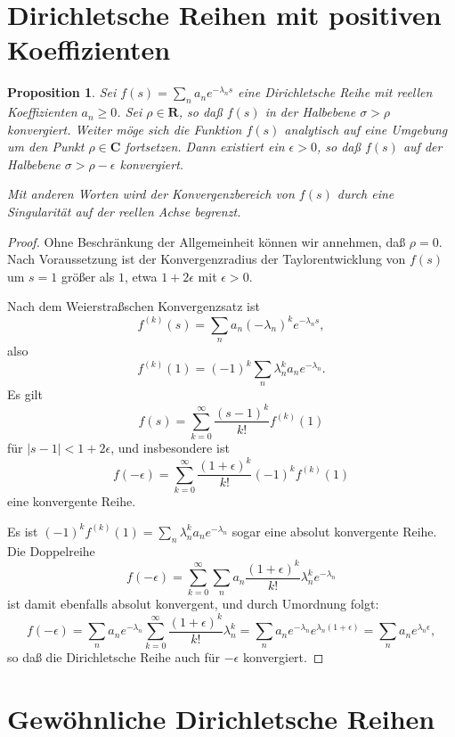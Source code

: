 \documentclass[a4paper,twoside,openright]{report}
\newtheorem{prop}[thm]{Proposition}
\theoremstyle{definition}
\theoremstyle{remark}
\begin{document}
\section{Dirichletsche Reihen mit positiven Koeffizienten}

\begin{prop}
  \label{prop:positivity}
  Sei $f(s) = \sum_n a_n e^{-\lambda_n s}$ eine Dirichletsche Reihe mit
  reellen Koeffizienten $a_n \ge 0$. Sei $\rho \in \mathbf R$, so daß
  $f(s)$ in der Halbebene $\sigma > \rho$ konvergiert. Weiter möge sich die
  Funktion $f(s)$ analytisch auf eine Umgebung um den Punkt $\rho \in \mathbf C$
  fortsetzen. Dann existiert ein $\epsilon > 0$, so daß $f(s)$ auf der Halbebene
  $\sigma > \rho - \epsilon$ konvergiert.
  
  Mit anderen Worten wird der Konvergenzbereich von $f(s)$ durch eine Singularität
  auf der reellen Achse begrenzt.
\end{prop}

\begin{proof}
  Ohne Beschränkung der Allgemeinheit können wir annehmen, daß
  $\rho = 0$.
  Nach Voraussetzung ist der Konvergenzradius der Taylorentwicklung von $f(s)$ um
  $s = 1$ größer als $1$, etwa $1 + 2 \epsilon$ mit $\epsilon > 0$.
  
  Nach dem Weierstraßschen Konvergenzsatz ist
  \[
    f^{(k)}(s) = \sum_n a_n (-\lambda_n)^k e^{-\lambda_n s},
  \]
  also
  \[
    f^{(k)}(1) = (-1)^k \sum_n \lambda_n^k a_n e^{-\lambda_n}.
  \]
  Es gilt
  \[
    f(s) = \sum_{k = 0}^\infty \frac {(s - 1)^k} {k!} f^{(k)}(1)
  \]
  für $|s - 1| < 1 + 2 \epsilon$,
  und insbesondere ist
  \[
    f(-\epsilon) = \sum_{k = 0}^\infty \frac {(1 + \epsilon)^k} {k!} (-1)^k f^{(k)}(1)
  \]
  eine konvergente Reihe.
  
  Es ist $(-1)^k f^{(k)}(1) = \sum_n \lambda_n^k a_n e^{-\lambda_n}$
  sogar eine absolut konvergente Reihe. Die Doppelreihe
  \[
    f(-\epsilon) = \sum_{k = 0}^\infty \sum_n a_n \frac {(1 + \epsilon)^k}{k!} \lambda_n^k e^{-\lambda_n}
  \]
  ist damit ebenfalls absolut konvergent, und durch Umordnung folgt:
  \[
    f(-\epsilon) = \sum_n a_n e^{-\lambda_n} \sum_{k = 0}^\infty \frac {(1 + \epsilon)^k}{k!} \lambda_n^k
    = \sum_n a_n e^{-\lambda_n} e^{\lambda_n (1 + \epsilon)} = \sum_n a_n e^{\lambda_n \epsilon},
  \]
  so daß die Dirichletsche Reihe auch für $-\epsilon$ konvergiert. 
\end{proof}

\section{Gewöhnliche Dirichletsche Reihen}
\end{document}
